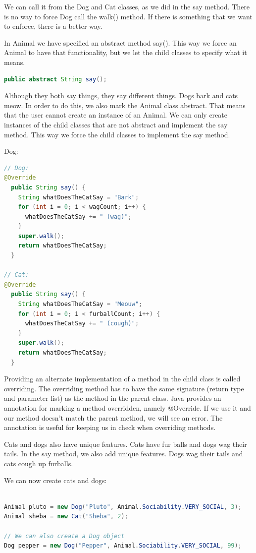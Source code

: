 We can call it from the Dog and Cat classes, as we did in the say method. There is no way to force Dog call the walk() method. If there is something that we want to enforce, there is a better way.

In Animal we have specified an abstract method say(). This way we force an Animal to have that functionality, but we let the child classes to specify what it means. 

\begin{lstlisting}[language=Java]
 public abstract String say();
\end{lstlisting}

Although they both say things, they say different things. Dogs bark and cats meow.
In order to do this, we also mark the Animal class abstract. That means that the user cannot create an instance of an Animal. We can only create instances of the child classes that are not abstract and implement the say method. This way we force the child classes to implement the say method.

Dog:
\begin{lstlisting}[language=Java]
// Dog:
@Override
  public String say() {
    String whatDoesTheCatSay = "Bark";
    for (int i = 0; i < wagCount; i++) {
      whatDoesTheCatSay += " (wag)";
    }
	super.walk();
    return whatDoesTheCatSay;
  }
  
// Cat:
@Override
  public String say() {
    String whatDoesTheCatSay = "Meouw";
    for (int i = 0; i < furballCount; i++) {
      whatDoesTheCatSay += " (cough)";
    }
    super.walk();
    return whatDoesTheCatSay;
  }
\end{lstlisting}

Providing an alternate implementation of a method in the child class is called overriding. The overriding method has to have the same signature (return type and parameter list) as the method in the parent class. Java provides an annotation for marking a method overridden, namely @Override. If we use it and our method doesn't match the parent method, we will see an error. The annotation is useful for keeping us in check when overriding methods.

Cats and dogs also have unique features.  Cats have fur balls and dogs wag their tails. In the say method, we also add unique features. Dogs wag their tails and cats cough up furballs.

We can now create cats and dogs:
\begin{lstlisting}[language=Java]

Animal pluto = new Dog("Pluto", Animal.Sociability.VERY_SOCIAL, 3);
Animal sheba = new Cat("Sheba", 2);

// We can also create a Dog object
Dog pepper = new Dog("Pepper", Animal.Sociability.VERY_SOCIAL, 99);

\end{lstlisting}

